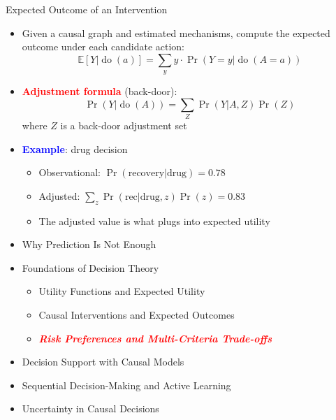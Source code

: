 \documentclass[
  10pt,
  ignorenonframetext,
]{beamer}
\providecommand{\tightlist}{%
  \setlength{\itemsep}{0pt}\setlength{\parskip}{0pt}}
\newcommand{\EE}{\mathbb{E}}
\begin{document}
\begin{frame}{Expected Outcome of an Intervention}
\label{expected-outcome-of-an-intervention}
\begin{itemize}
\item
  Given a causal graph and estimated mechanisms, compute the expected
  outcome under each candidate action: \[
  \EE[Y | \operatorname{do}(a)] = \sum_{y} y \cdot \Pr(Y = y | \operatorname{do}(A = a))
  \]
\item
  \textbf{\textcolor{red}{Adjustment formula}} (back-door): \[
  \Pr(Y | \operatorname{do}(A)) = \sum_{Z} \Pr(Y | A, Z) \Pr(Z)
  \] where \(Z\) is a back-door adjustment set
\item
  \textbf{\textcolor{blue}{Example}}: drug decision

  \begin{itemize}
  \tightlist
  \item
    Observational: \(\Pr(\text{recovery} | \text{drug}) = 0.78\)
  \item
    Adjusted: \(\sum_z \Pr(\text{rec} | \text{drug}, z) \Pr(z) = 0.83\)
  \item
    The adjusted value is what plugs into expected utility
  \end{itemize}
\end{itemize}
\end{frame}

\begin{frame}{}
\label{section-7}
\begin{itemize}
\tightlist
\item
  Why Prediction Is Not Enough
\item
  Foundations of Decision Theory

  \begin{itemize}
  \tightlist
  \item
    Utility Functions and Expected Utility
  \item
    Causal Interventions and Expected Outcomes
  \item
    \emph{\textbf{\textcolor{red}{Risk Preferences and Multi-Criteria Trade-offs}}}
  \end{itemize}
\item
  Decision Support with Causal Models
\item
  Sequential Decision-Making and Active Learning
\item
  Uncertainty in Causal Decisions
\end{itemize}
\end{frame}
\end{document}
